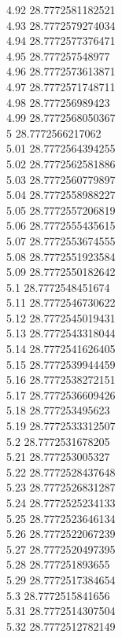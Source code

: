 {4.92	28.7772581182521\\
4.93	28.7772579274034\\
4.94	28.7772577376471\\
4.95	28.777257548977\\
4.96	28.7772573613871\\
4.97	28.7772571748711\\
4.98	28.777256989423\\
4.99	28.7772568050367\\
5	28.7772566217062\\
5.01	28.7772564394255\\
5.02	28.7772562581886\\
5.03	28.7772560779897\\
5.04	28.7772558988227\\
5.05	28.7772557206819\\
5.06	28.7772555435615\\
5.07	28.7772553674555\\
5.08	28.7772551923584\\
5.09	28.7772550182642\\
5.1	28.7772548451674\\
5.11	28.7772546730622\\
5.12	28.7772545019431\\
5.13	28.7772543318044\\
5.14	28.7772541626405\\
5.15	28.7772539944459\\
5.16	28.7772538272151\\
5.17	28.7772536609426\\
5.18	28.777253495623\\
5.19	28.7772533312507\\
5.2	28.7772531678205\\
5.21	28.777253005327\\
5.22	28.7772528437648\\
5.23	28.7772526831287\\
5.24	28.7772525234133\\
5.25	28.7772523646134\\
5.26	28.7772522067239\\
5.27	28.7772520497395\\
5.28	28.777251893655\\
5.29	28.7772517384654\\
5.3	28.7772515841656\\
5.31	28.7772514307504\\
5.32	28.7772512782149\\
}
